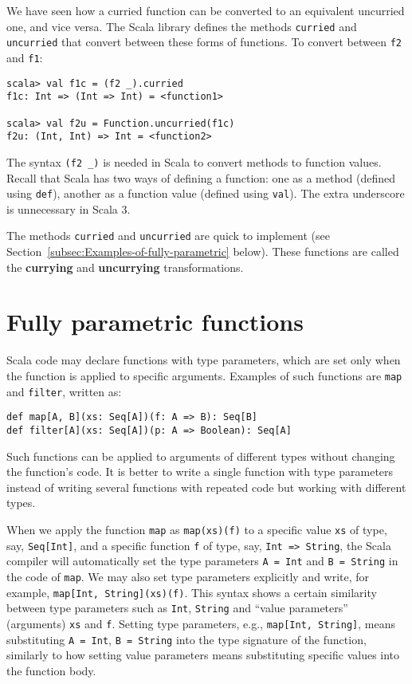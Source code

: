We have seen how a curried function can be converted to an equivalent
uncurried one, and vice versa. The Scala library defines the methods
\lstinline!curried! and \lstinline!uncurried! that convert between
these forms of functions. To convert between \lstinline!f2! and \lstinline!f1!:
\begin{lstlisting}
scala> val f1c = (f2 _).curried
f1c: Int => (Int => Int) = <function1>

scala> val f2u = Function.uncurried(f1c)
f2u: (Int, Int) => Int = <function2> 
\end{lstlisting}
The syntax \lstinline!(f2 _)! is needed in Scala to convert methods
to function values. Recall that Scala has two ways of defining a function:
one as a method (defined using \lstinline!def!),
another as a function value (defined using
\lstinline!val!). The extra underscore is unnecessary in Scala 3.

The methods \lstinline!curried! and \lstinline!uncurried! are quick
to implement (see Section~\ref{subsec:Examples-of-fully-parametric}
below). These functions are called the \textbf{currying}
and \textbf{uncurrying} transformations.

\section{Fully parametric functions\label{sec:Fully-parametric-functions}}

Scala code may declare functions with type parameters, which are set
only when the function is applied to specific arguments. Examples
of such functions are \lstinline!map! and \lstinline!filter!, written
as:
\begin{lstlisting}
def map[A, B](xs: Seq[A])(f: A => B): Seq[B]
def filter[A](xs: Seq[A])(p: A => Boolean): Seq[A]
\end{lstlisting}
Such functions can be applied to arguments of different types without
changing the function\textsf{'}s code. It is better to write a single function
with type parameters instead of writing several functions with repeated
code but working with different types.

When we apply the function \lstinline!map! as \lstinline!map(xs)(f)!
to a specific value \lstinline!xs! of type, say, \lstinline!Seq[Int]!,
and a specific function \lstinline!f! of type, say, \lstinline!Int => String!,
the Scala compiler will automatically set the type parameters \lstinline!A = Int!
and \lstinline!B = String! in the code of \lstinline!map!. We may
also set type parameters explicitly and write, for example, \lstinline!map[Int, String](xs)(f)!.
This syntax shows a certain similarity between type parameters such
as \lstinline!Int!, \lstinline!String! and \textsf{``}value parameters\textsf{''}
(arguments) \lstinline!xs! and \lstinline!f!. Setting type parameters,
e.g., \lstinline!map[Int, String]!, means substituting \lstinline!A = Int!,
\lstinline!B = String! into the type signature of the function, similarly
to how setting value parameters means substituting specific values
into the function body.

